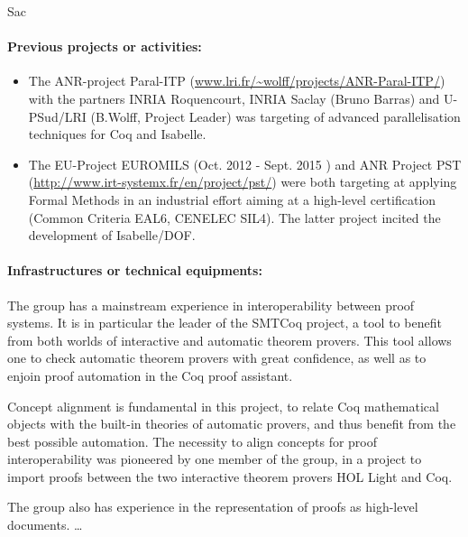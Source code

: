 \begin{sitedescription}{Sac}
\paragraph{Previous projects or activities:}


\begin{itemize}
\item The ANR-project Paral-ITP (\url{www.lri.fr/~wolff/projects/ANR-Paral-ITP/}) with the  
      partners INRIA Roquencourt, INRIA Saclay (Bruno Barras) 
      and U-PSud/LRI (B.Wolff, Project Leader) was targeting 
      of advanced parallelisation techniques for Coq and Isabelle.
\item The EU-Project EUROMILS (Oct. 2012 - Sept. 2015 ) and 
      ANR Project PST (\url{http://www.irt-systemx.fr/en/project/pst/})
      were both targeting at applying Formal Methods in an industrial
      effort aiming at a high-level certification (Common Criteria EAL6, 
      CENELEC SIL4). The latter project incited the development of 
      Isabelle/DOF\cite{brucker_achim_d_2019_3370483}.
\end{itemize} 

\paragraph{Infrastructures or technical equipments:}


The group has a mainstream experience in interoperability between proof
systems. It is in particular the leader of the SMTCoq project, a tool to
benefit from both worlds of interactive and automatic theorem provers.
This tool allows one to check automatic theorem provers with great
confidence, as well as to enjoin proof automation in the Coq proof
assistant.

Concept alignment is fundamental in this project, to relate Coq
mathematical objects with the built-in theories of automatic provers,
and thus benefit from the best possible automation. The necessity to
align concepts for proof interoperability was pioneered by one member of
the group, in a project to import proofs between the two interactive
theorem provers HOL Light and Coq.

The group also has experience in the representation of proofs as
high-level documents. \dots


\end{sitedescription}

